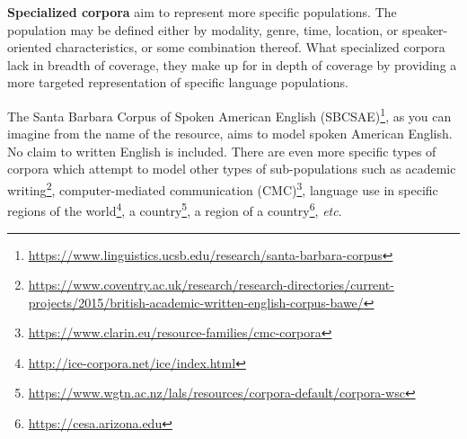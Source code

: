 \documentclass[
  letterpaper,
  DIV=11,
  numbers=noendperiod]{scrreport}
\theoremstyle{definition}
\theoremstyle{remark}
\DeclareRobustCommand{\href}[2]{#2\footnote{\url{#1}}}
\begin{document}
\textbf{Specialized corpora} aim to represent more specific populations.
The population may be defined either by modality, genre, time, location,
or speaker-oriented characteristics, or some combination thereof. What
specialized corpora lack in breadth of coverage, they make up for in
depth of coverage by providing a more targeted representation of
specific language populations.

The
\href{https://www.linguistics.ucsb.edu/research/santa-barbara-corpus}{Santa
Barbara Corpus of Spoken American English (SBCSAE)}, as you can imagine
from the name of the resource, aims to model spoken American English. No
claim to written English is included. There are even more specific types
of corpora which attempt to model other types of sub-populations such as
\href{https://www.coventry.ac.uk/research/research-directories/current-projects/2015/british-academic-written-english-corpus-bawe/}{academic
writing},
\href{https://www.clarin.eu/resource-families/cmc-corpora}{computer-mediated
communication (CMC)}, language use in specific
\href{http://ice-corpora.net/ice/index.html}{regions of the world}, a
\href{https://www.wgtn.ac.nz/lals/resources/corpora-default/corpora-wsc}{country},
a \href{https://cesa.arizona.edu}{region of a country}, \emph{etc}.
\end{document}
